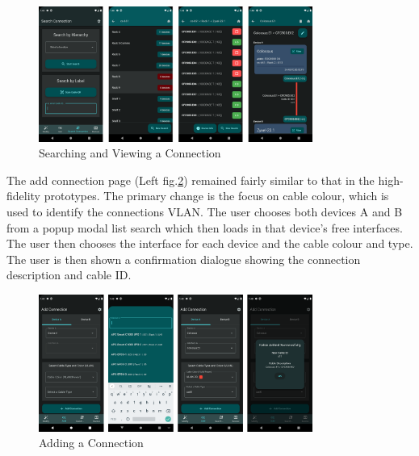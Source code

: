 \documentclass [11pt,a4paper]{article}
\begin{document}
\begin{figure}[H]
    \centering
    \includegraphics[width=0.8\textwidth]{images/final_search.png}
    \caption{Searching and Viewing a Connection}
    \label{fig:search_connection}
\end{figure}

The add connection page (Left fig.\ref{fig:add_connection}) remained fairly similar to that in the high-fidelity prototypes. The primary change is the focus on cable colour, which is used to identify the connections VLAN. The user chooses both devices A and B from a popup modal list search which then loads in that device's free interfaces. The user then chooses the interface for each device and the cable colour and type. The user is then shown a confirmation dialogue showing the connection description and cable ID.  

\begin{figure}[H]
    \centering
    \includegraphics[width=0.8\textwidth]{images/final_add.png}
    \caption{Adding a Connection}
    \label{fig:add_connection}
\end{figure}
\end{document}

